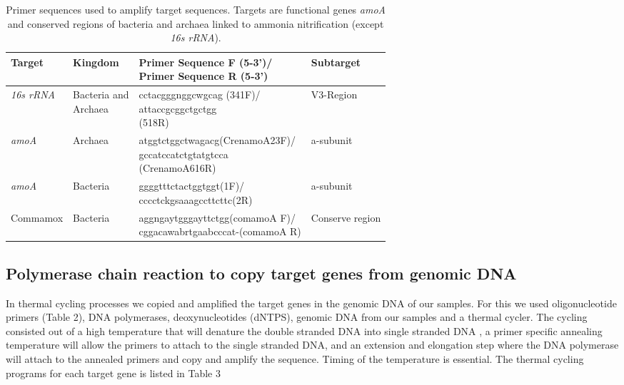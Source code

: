 \documentclass[twoside,12pt,final]{ucthesis-CA2012}
\begin{document}
\begin{ucmainmatter}
\begin{table}
\caption{\label{tab:primerTable}Primer sequences used to amplify target sequences. Targets are functional genes \textit{amoA} and conserved regions of bacteria and archaea linked to ammonia nitrification (except \textit{16s rRNA}).}
\centering
\begin{tabular}[t]{llll}
\toprule
Target & Kingdom & \makecell[l]{Primer Sequence F (5-3')/\\ Primer Sequence R (5-3')} & Subtarget\\
\midrule
\textit{16s rRNA} & \makecell[l]{Bacteria and\\Archaea} & \makecell[l]{cctacgggnggcwgcag (341F)/\\attaccgcggctgctgg\\(518R)} & V3-Region\\
\textit{amoA} & Archaea & \makecell[l]{atggtctggctwagacg(CrenamoA23F)/\\gccatccatctgtatgtcca\\(CrenamoA616R)} & a-subunit\\
\textit{amoA} & Bacteria & \makecell[l]{ggggtttctactggtggt(1F)/\\cccctckgsaaagccttcttc(2R)} & a-subunit\\
Commamox & Bacteria & \makecell[l]{aggngaytgggayttctgg(comamoA F)/\\cggacawabrtgaabcccat-(comamoA R)} & Conserve
region\\
\bottomrule
\end{tabular}
\end{table}
\hypertarget{polymerase-chain-reaction-to-copy-target-genes-from-genomic-dna}{%
\subsection{Polymerase chain reaction to copy target genes from genomic DNA}\label{polymerase-chain-reaction-to-copy-target-genes-from-genomic-dna}}

In thermal cycling processes we copied and amplified the target genes in the genomic DNA of our samples. For this we used oligonucleotide primers (Table 2), DNA polymerases, deoxynucleotides (dNTPS), genomic DNA from our samples and a thermal cycler. The cycling consisted out of a high temperature that will denature the double stranded DNA into single stranded DNA , a primer specific annealing temperature will allow the primers to attach to the single stranded DNA, and an extension and elongation step where the DNA polymerase will attach to the annealed primers and copy and amplify the sequence. Timing of the temperature is essential. The thermal cycling programs for each target gene is listed in Table 3
\begin{table}


\end{table}
\end{ucmainmatter}
\end{document}
